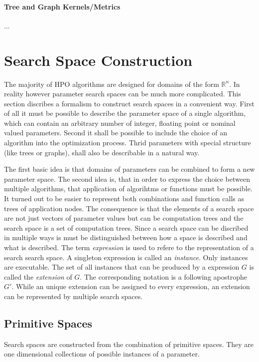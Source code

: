 \documentclass[english]{article}
\begin{document}
\paragraph{Tree and Graph Kernels/Metrics}
...

\newpage

\section{Search Space Construction}
The majority of \ac{HPO} algorithms are designed for domains of the form $\mathbb{R}^n$. In reality however parameter search spaces can be much more complicated. This section discribes a formalism to construct search spaces in a convenient way. First of all it must be possible to describe the parameter space of a single algorithm, which can contain an arbitrary number of integer, floating point or nominal valued parameters. Second it shall be possible to include the choice of an algorithm into the optimization process. Thrid parameters with special structure (like trees or graphs), shall also be describable in a natural way.

The first basic idea is that domains of parameters can be combined to form a new parameter space. The second idea is, that in order to express the choice between multiple algorithms, that application of algorihtms or functions must be possible. It turned out to be easier to represent both combinations and function calls as trees of application nodes.
The consequence is that the elements of a search space are not just vectors of parameter values but can be computation trees and the search space is a set of computation trees.
Since a search space can be discribed in multiple ways is must be distinguished between how a space is described and what is described. The term \textit{expression} is used to refere to the representation of a search search space. A singleton expression is called an \textit{instance}. Only instances are executable. The set of all instances that can be produced by a expression $G$ is called the \textit{extension} of $G$. The corresponding notation is a following apostrophe $G'$. While an unique extension can be assigned to every expression, an extension can be represented by multiple search spaces.

\subsection{Primitive Spaces}

Search spaces are constructed from the combination of primitive spaces. They are one dimensional collections of possible instances of a parameter.
\end{document}
